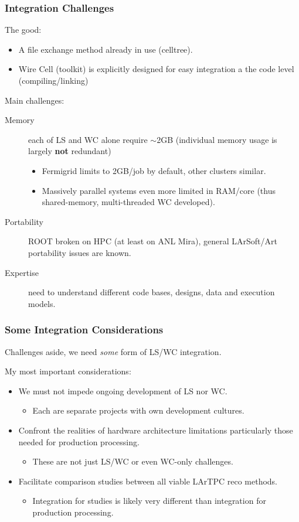 \documentclass[xcolor=dvipsnames]{beamer}
\begin{document}
\begin{frame}
  \frametitle{Integration Challenges}
  The good:
  \begin{itemize}
  \item A file exchange method already in use (celltree).
  \item Wire Cell (toolkit) is explicitly designed for easy integration a the code level (compiling/linking)
  \end{itemize}
  Main challenges:
  \begin{description}
  \item[Memory] each of LS and WC alone require $\sim$2GB
    (individual memory usage is largely \textbf{not} redundant)
    \begin{itemize}\footnotesize
    \item Fermigrid limits to 2GB/job by default, other clusters similar.
    \item Massively parallel systems even more limited in RAM/core (thus shared-memory, multi-threaded WC developed).
    \end{itemize}
  \item[Portability] ROOT broken on HPC (at least on ANL Mira),
    general LArSoft/Art portability issues are known.
  \item[Expertise] need to understand different code bases, designs, data and execution models.
  \end{description}
\end{frame}

\begin{frame}
  \frametitle{Some Integration Considerations} 

  Challenges aside, we need \textit{some} form of LS/WC integration.  

  \vspace{3mm}

  My most important considerations:

  \begin{itemize}
  \item We must not impede ongoing development of LS nor WC.
    \begin{itemize}
    \item Each are separate projects with own development cultures.
    \end{itemize}
  \item Confront the realities of hardware architecture limitations
    particularly those needed for production processing.
    \begin{itemize}
    \item These are not just LS/WC or even WC-only challenges.
    \end{itemize}
  \item Facilitate comparison studies between all viable LArTPC reco
    methods.
    \begin{itemize}
    \item Integration for studies is likely very different than integration for production processing.
    \end{itemize}
  \end{itemize}


\end{frame}
\end{document}
